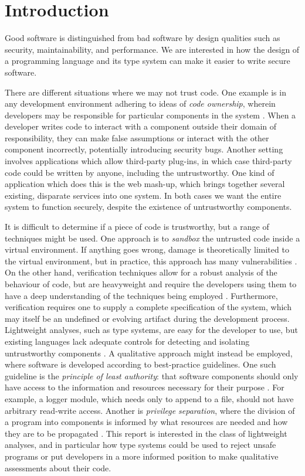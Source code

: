 \chapter{Introduction}\label{C:intro}

Good software is distinguished from bad software by design qualities such as security, maintainability, and performance. We are interested in how the design of a programming language and its type system can make it easier to write secure software.

There are different situations where we may not trust code. One example is in any development environment adhering to ideas of \textit{code ownership}, wherein developers may be responsible for particular components in the system \cite{bird_ownership}. When a developer writes code to interact with a component outside their domain of responsibility, they can make false assumptions or interact with the other component incorrectly, potentially introducing security bugs. Another setting involves applications which allow third-party plug-ins, in which case third-party code could be written by anyone, including the untrustworthy. One kind of application which does this is the web mash-up, which brings together several existing, disparate services into one system. In both cases we want the entire system to function securely, despite the existence of untrustworthy components.

It is difficult to determine if a piece of code is trustworthy, but a range of techniques might be used. One approach is to \textit{sandbox} the untrusted code inside a virtual environment. If anything goes wrong, damage is theoretically limited to the virtual environment, but in practice, this approach has many vulnerabilities \cite{coker15, maass16, watson07, schreuders13}. On the other hand, verification techniques allow for a robust analysis of the behaviour of code, but are heavyweight and require the developers using them to have a deep understanding of the techniques being employed \cite{kneuper97}. Furthermore, verification requires one to supply a complete specification of the system, which may itself be an undefined or evolving artifact during the development process. Lightweight analyses, such as type systems, are easy for the developer to use, but existing languages lack adequate controls for detecting and isolating untrustworthy components \cite{chen07, ter-louw08}. A qualitative approach might instead be employed, where software is developed according to best-practice guidelines. One such guideline is the \textit{principle of least authority}: that software components should only have access to the information and resources necessary for their purpose \cite{saltzer74}. For example, a logger module, which needs only to append to a file, should not have arbitrary read-write access. Another is \textit{privilege separation}, where the division of a program into components is informed by what resources are needed and how they are to be propagated \cite{saltzer75}. This report is interested in the class of lightweight analyses, and in particular how type systems could be used to reject unsafe programs or put developers in a more informed position to make qualitative assessments about their code.

